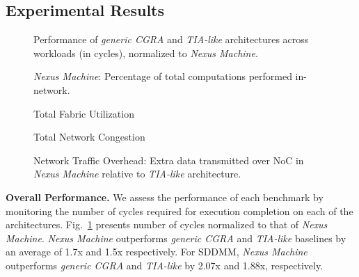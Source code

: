 \subsection{Experimental Results}
\begin{figure}[h!]
	\scriptsize
	\centering
	
	\caption{Performance of \textit{generic CGRA} and \textit{TIA-like} architectures across workloads (in cycles), normalized to \textit{Nexus Machine}.} 
	\label{fig:performance}
\end{figure}
\vspace{-0.8cm}
\begin{figure}[h!]
	\scriptsize
	\centering
	
	\caption{\textit{Nexus Machine}: Percentage of total computations performed in-network.} 
	\label{fig:innetworkcomp}
\end{figure}
\vspace{-0.8cm}
\begin{figure}[h!]
	\scriptsize
	\centering
	
	\caption{Total Fabric Utilization} 
	\label{fig:utilization}
\end{figure}
\vspace{-0.5cm}
\begin{figure}[h!]
	\scriptsize
	\centering
    
	\caption{Total Network Congestion} 
	\label{fig:congestion}
\end{figure}
\vspace{-0.2cm}
\begin{figure}[h!]
	\scriptsize
	\centering
	
	\caption{Network Traffic Overhead: Extra data transmitted over NoC in \textit{Nexus Machine} relative to \textit{TIA-like} architecture.}
	\label{fig:network_overhead}
\end{figure}

{\bf Overall Performance.}
We assess the performance of each benchmark by monitoring the number of cycles required for execution completion on each of the architectures. Fig.~\ref{fig:performance} presents number of cycles normalized to that of \textit{Nexus Machine}.
\textit{Nexus Machine} outperforms \textit{generic CGRA} and \textit{TIA-like} baselines by an average of 1.7x and 1.5x respectively. For SDDMM, \textit{Nexus Machine} outperforms \textit{generic CGRA} and \textit{TIA-like} by 2.07x and 1.88x, respectively.

